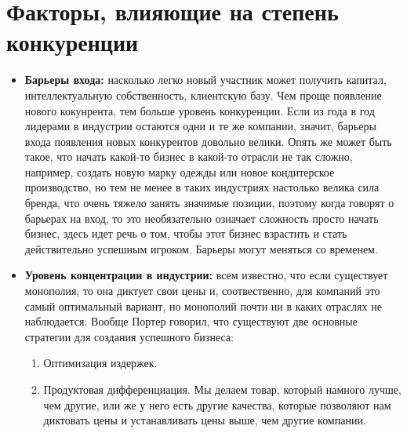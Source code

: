 \documentclass{article}
\begin{document}
	
	\section{Факторы, влияющие на степень конкуренции}
	\begin{itemize}
		\item \textbf{Барьеры входа:} насколько легко новый участник может получить капитал, интеллектуальную собственность, клиентскую базу. Чем проще появление нового кокунрента, тем больше уровень конкуренции. Если из года в год лидерами в индустрии остаются одни и те же компании, значит, барьеры входа появления новых конкурентов довольно велики. Опять же может быть такое, что начать какой-то бизнес в какой-то отрасли не так сложно, например, создать новую марку одежды или новое кондитерское производство, но тем не менее в таких индустриях настолько велика сила бренда, что очень тяжело занять значимые позиции, поэтому когда говорят о барьерах на вход, то это необязательно означает сложность просто начать бизнес, здесь идет речь о том, чтобы этот бизнес взрастить и стать действительно успешным игроком. Барьеры могут меняться со временем. 
	
	\item \textbf{Уровень концентрации в индустрии:} всем известно, что если существует монополия, то она диктует свои цены и, соотвественно, для компаний это самый оптимальный вариант, но монополий почти ни в каких отраслях не наблюдается. Вообще Портер говорил, что существуют две основные стратегии для создания успешного бизнеса:
	\begin{enumerate}
	\item Оптимизация издержек.
	\item Продуктовая дифференциация. Мы делаем товар, который намного лучше, чем другие, или же у него есть другие качества, которые позволяют нам диктовать цены и устанавливать цены выше, чем другие компании.
	\end{enumerate}
	

\end{itemize}
\end{document}
